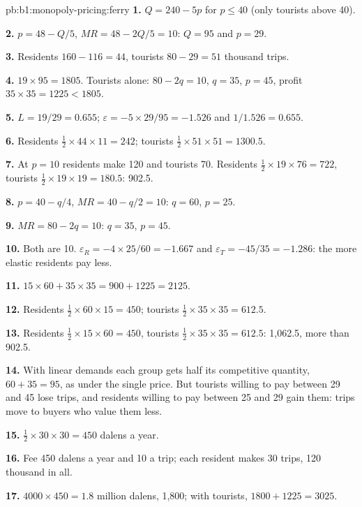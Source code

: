 \begin{solution}{pb:b1:monopoly-pricing:ferry}
\textbf{1.} $Q = 240 - 5p$ for $p \le 40$ (only tourists above 40).

\textbf{2.} $p = 48 - Q/5$, $MR = 48 - 2Q/5 = 10$: $Q = 95$ and $p = 29$.

\textbf{3.} Residents $160 - 116 = 44$, tourists $80 - 29 = 51$ thousand trips.

\textbf{4.} $19 \times 95 = 1805$. Tourists alone: $80 - 2q = 10$, $q = 35$, $p = 45$, profit
$35 \times 35 = 1225 < 1805$.

\textbf{5.} $L = 19/29 = 0.655$; $\varepsilon = -5 \times 29/95 = -1.526$ and $1/1.526 = 0.655$.

\textbf{6.} Residents $\tfrac12 \times 44 \times 11 = 242$; tourists $\tfrac12 \times 51 \times 51 = 1300.5$.

\textbf{7.} At $p = 10$ residents make 120 and tourists 70. Residents
$\tfrac12 \times 19 \times 76 = 722$, tourists $\tfrac12 \times 19 \times 19 = 180.5$: 902.5.

\textbf{8.} $p = 40 - q/4$, $MR = 40 - q/2 = 10$: $q = 60$, $p = 25$.

\textbf{9.} $MR = 80 - 2q = 10$: $q = 35$, $p = 45$.

\textbf{10.} Both are 10. $\varepsilon_R = -4 \times 25/60 = -1.667$ and $\varepsilon_T = -45/35 = -1.286$: the more
elastic residents pay less.

\textbf{11.} $15 \times 60 + 35 \times 35 = 900 + 1225 = 2125$.

\textbf{12.} Residents $\tfrac12 \times 60 \times 15 = 450$; tourists $\tfrac12 \times 35 \times 35 = 612.5$.

\textbf{13.} Residents $\tfrac12 \times 15 \times 60 = 450$, tourists $\tfrac12 \times 35 \times 35 = 612.5$: 1,062.5, more than
902.5.

\textbf{14.} With linear demands each group gets half its competitive
quantity, $60 + 35 = 95$, as under the single price. But tourists willing to pay
between 29 and 45 lose trips, and residents willing to pay between 25 and
29 gain them: trips move to buyers who value them less.

\textbf{15.} $\tfrac12 \times 30 \times 30 = 450$ dalens a year.

\textbf{16.} Fee 450 dalens a year and 10 a trip; each resident makes 30 trips,
120 thousand in all.

\textbf{17.} $4000 \times 450 = 1.8$ million dalens, 1,800; with tourists, $1800 + 1225 = 3025$.


\end{solution}
